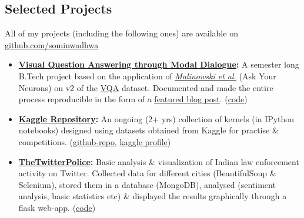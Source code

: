 \documentclass[margin,line]{res}
\begin{document}
\begin{resume}
\section{\sc Selected Projects}
All of my projects (including the following ones) are available on {\href{https://github.com/sominwadhwa}{github.com/sominwadhwa}}\\
\begin{itemize}[leftmargin=*]
\item {\bf {\href{https://github.com/sominwadhwa/vqamd_floyd}{Visual Question Answering through Modal Dialogue}:}}
A semester long B.Tech project based on the application of \textit{\href{https://arxiv.org/pdf/1505.01121.pdf}{\underline{Malinowski et al.}}} (Ask Your Neurons) on v2 of the {\href{http://visualqa.org/}{\underline{VQA}}} dataset. Documented and made the entire process reproducible in the form of a \href{https://blog.floydhub.com/asking-questions-to-images-with-deep-learning/}{\underline{featured blog post}}. ({\href{https://github.com/sominwadhwa/vqamd_floyd}{\underline{code}}})
\item {\bf {\href{https://github.com/sominwadhwa/Kaggle}{Kaggle Repository}:}}
An ongoing (2+ yrs) collection of kernels (in IPython notebooks) designed using datasets obtained from Kaggle for practise \& competitions. ({\href{https://github.com/sominwadhwa/Kaggle}{\underline{github-repo}}}, {\href{https://www.kaggle.com/sominwadhwa}{\underline{kaggle profile}}})
\item {\bf {\href{https://github.com/sominwadhwa/TheTwitterPolice}{TheTwitterPolice}:}}
Basic analysis \& visualization of Indian law enforcement activity on Twitter. Collected data for different cities (BeautifulSoup \& Selenium), stored them in a database (MongoDB), analysed (sentiment analysis, basic statistics etc) \& displayed the results graphically through a flask web-app. ({\href{https://github.com/sominwadhwa/TheTwitterPolice}{\underline{code}}})
\end{itemize}

\iffalse
\section{\sc Technical Skills}
{\bf Strongest Areas}: Machine Learning (Classification, Regression, Feature Engineering), Algorithms, Statistical Data Analysis\\
{\bf Languages/Tools/Software}: Python (scikit-learn, Keras, NumPy, Pandas \& others), Java, SQL, MongoDB, \LaTeX, MS Excel
\fi


\end{resume}
\end{document}
